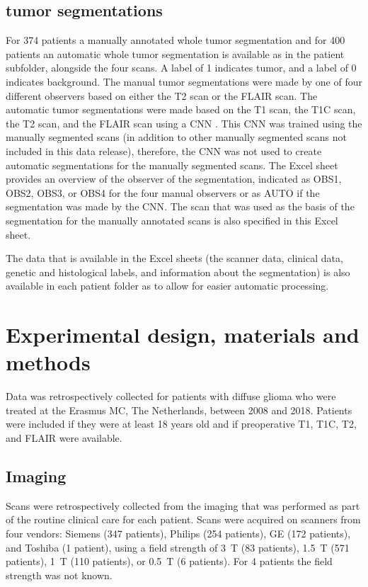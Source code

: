 \subsection{\Gls{tumor} segmentations}
For 374 patients a manually annotated whole \gls{tumor} segmentation and for 400 patients an automatic whole \gls{tumor} segmentation is available as  in the patient subfolder, alongside the four scans.
A label of 1 indicates \gls{tumor}, and a label of 0 indicates background.
The manual \gls{tumor} segmentations were made by one of four different observers based on either the \gls{T2} scan or the \gls{FLAIR} scan.
The automatic \gls{tumor} segmentations were made based on the  \gls{T1} scan, the \gls{T1C} scan, the \gls{T2} scan, and the \gls{FLAIR} scan using a \gls{CNN} \autocite{voortunpublishedsubtypingEGD}.
This \gls{CNN} was trained using the manually segmented scans (in addition to other manually segmented scans not included in this data release), therefore, the \gls{CNN} was not used to create automatic segmentations for the manually segmented scans.
The Excel sheet  provides an overview of the observer of the segmentation, indicated as OBS1, OBS2, OBS3, or OBS4 for the four manual observers or as AUTO if the segmentation was made by the \gls{CNN}.
The scan that was used as the basis of the segmentation for the manually annotated scans is also specified in this Excel sheet.

The data that is available in the Excel sheets (the scanner data, clinical data, genetic and histological labels, and information about the segmentation) is also available in each patient folder as  to allow for easier automatic processing.

\section{Experimental design, materials and methods}

Data was retrospectively collected for patients with diffuse glioma who were treated at the Erasmus MC, The Netherlands, between 2008 and 2018.
Patients were included if they were at least 18 years old and if preoperative \gls{T1}, \gls{T1C}, \gls{T2}, and \gls{FLAIR} were available.

\subsection{Imaging}

Scans were retrospectively collected from the imaging that was performed as part of the routine clinical care for each patient.
Scans were acquired on scanners from four vendors: Siemens (347 patients), Philips (254 patients), GE (172 patients), and Toshiba (1 patient), using a field strength of \SI{3}{\tesla} (83 patients), \SI{1.5}{\tesla} (571 patients), \SI{1}{\tesla} (110 patients), or \SI{0.5}{\tesla} (6 patients).
For 4 patients the field strength was not known.


